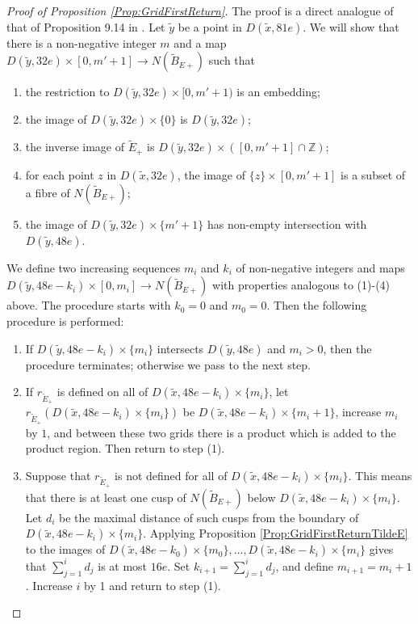 \documentclass[oneside]{amsart}
\numberwithin{equation}{section}
\theoremstyle{plain}
\theoremstyle{definition}
\begin{document}
\begin{proof}[Proof of Proposition \ref{Prop:GridFirstReturn}]
The proof is a direct analogue of that of Proposition 9.14 in \cite{Lackenby:PolyUnknot}.
Let $\tilde y$ be a point in $D(\tilde x, 81e)$. We will show that there is a non-negative integer $m$ and
a map
$D(\tilde y, 32e) \times [0,m'+1] \rightarrow N(\tilde B_{E+})$ such that
\begin{enumerate}
\item the restriction to $D(\tilde y, 32e) \times [0,m'+1)$ is an embedding;
\item the image of $D(\tilde y, 32e) \times \{ 0 \}$ is $D(\tilde y, 32e)$;
\item the inverse image of $\tilde E_+$ is $D(\tilde y, 32e) \times ([0,m'+1] \cap \mathbb{Z})$;
\item for each point $z$ in $D(\tilde x, 32e)$, the image of $\{ z \} \times [0,m'+1]$ is a subset of
a fibre of $N(\tilde B_{E+})$;
\item the image of $D(\tilde y, 32e) \times \{ m'+1 \}$ has non-empty intersection with $D(\tilde y, 48e)$.
\end{enumerate}

We define two increasing sequences $m_i$ and $k_i$ of non-negative integers and maps
$D(\tilde y, 48e - k_i) \times [0,m_i] \rightarrow N(\tilde B_{E+})$ with properties analogous to
(1)-(4) above. The procedure starts with $k_0 = 0$
and $m_0 = 0$. Then the following procedure is performed:
\begin{enumerate}
\item If $D(\tilde y, 48e - k_i) \times  \{ m_i \}$ intersects $D(\tilde y, 48e)$ and $m_i > 0$, then the procedure terminates;
otherwise we pass to the next step.
\item If $r_{\tilde E_+}$ is defined on all of $D(\tilde x, 48e - k_i) \times  \{ m_i \}$, let $r_{\tilde E_+}(D(\tilde x, 48e - k_i) \times  \{ m_i \})$
be $D(\tilde x, 48e - k_i) \times  \{ m_i + 1\}$, increase $m_i$ by $1$, and between these two grids there is a product
which is added to the product region. Then return to step (1).
\item Suppose that $r_{\tilde E_+}$ is not defined for all of $D(\tilde x, 48e - k_i) \times  \{ m_i \}$. This means that there is at least one cusp
of $N(\tilde B_{E+})$ below $D(\tilde x, 48e - k_i) \times  \{ m_i \}$. Let $d_i$ be the maximal distance of such cusps from the boundary of 
$D(\tilde x, 48e - k_i) \times  \{ m_i \}$. Applying Proposition \ref{Prop:GridFirstReturnTildeE} to the
images of $D(\tilde x, 48e - k_0) \times  \{ m_0\}, \dots,  D(\tilde x, 48e - k_i) \times  \{ m_i\}$
gives that $\sum_{j=1}^i d_j$ is at most $16e$. Set $k_{i+1} = \sum_{j=1}^i d_j$, and define $m_{i+1} = m_i + 1$.
Increase $i$ by 1 and return to step (1).
\end{enumerate}


\end{proof}
\end{document}
